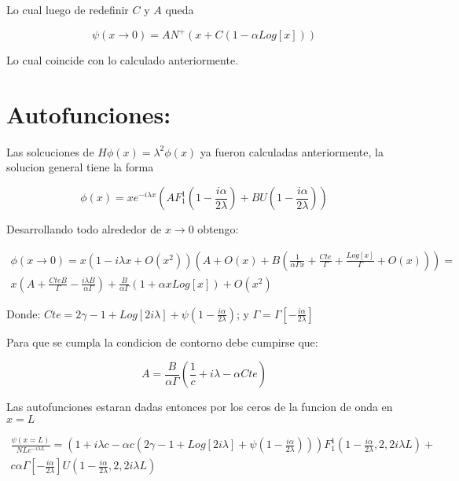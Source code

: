 Lo cual luego de redefinir $C$ y $A$ queda 

\begin{equation}
\psi (x \rightarrow 0 ) = A N ^{+} 
\left(
x + C (1- \alpha Log[x] )
\right)
\end{equation}

Lo cual coincide con lo calculado anteriormente.

\section{Autofunciones:}

Las solcuciones de $H \phi (x) = \lambda ^2 \phi (x)$ ya fueron calculadas anteriormente, la solucion general tiene la forma

\begin{equation}
\phi (x) = 
x e ^{-i \lambda x}
\left(
A  F _1 ^1 \left( 1 - \frac{i \alpha}{2\lambda}  \right) + 
B  U \left( 1 - \frac{i \alpha}{2\lambda}  \right)
\right)
\end{equation}

Desarrollando todo alrededor de $x \rightarrow 0$ obtengo:

\begin{equation}
\begin{array}{c}
\phi (x \rightarrow 0 ) = 
x 
\left(
	1 - i \lambda x + O (x ^2)
	\right)
\left(
	A + O (x) + B \left( \frac{1}{\alpha \Gamma x} + \frac{Cte}{\Gamma} + \frac{Log[x]}{\Gamma} + O(x)\right)	
	\right) = \\
x \left( A + \frac{Cte B}{\Gamma} - \frac{i \lambda B}{\alpha \Gamma}  \right) +
\frac{B}{\alpha	\Gamma} (1 + \alpha x Log[x] ) + O (x^2)
\end{array}
\end{equation}

Donde: $Cte = 2 \gamma -1 + Log[2 i \lambda] + \psi \left( 1 - \frac{i \alpha}{2 \lambda}\right)$; y $\Gamma = \Gamma \left[ - \frac{i \alpha}{2 \lambda} \right]$

Para que se cumpla la condicion de contorno debe cumpirse que:

\begin{equation}
A = \frac{B}{\alpha	\Gamma} 
\left(
\frac{1}{c} + i \lambda - \alpha Cte
\right)
\end{equation}

Las autofunciones estaran dadas entonces por los ceros de la funcion de onda en $x=L$

\begin{equation}
\begin{array}{c}
\frac{\psi (x=L)}{N L e ^{-i \lambda L} }
 = 
\left(
1+ i \lambda c - \alpha c 
\left(
2 \gamma -1 + Log[2 i \lambda] + 
\psi 
( 1 - \frac{i \alpha}{2 \lambda} )
\right)  
\right)
F _1 ^1 (1 - \frac{i \alpha}{2 \lambda},2,2 i \lambda L ) + \\
c \alpha \Gamma [-\frac{i \alpha}{2 \lambda}]
U (1 - \frac{i \alpha}{2 \lambda},2,2 i \lambda L )
\end{array}
\end{equation}

